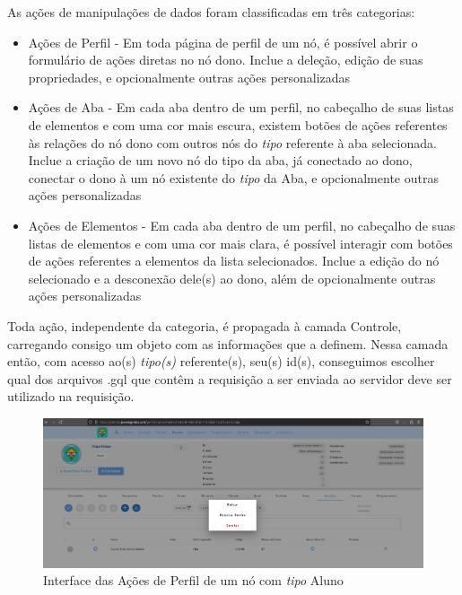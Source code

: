 As ações de manipulações de dados foram classificadas em três categorias:
\begin{itemize}
    \item Ações de Perfil - Em toda página de perfil de um nó, é possível abrir o formulário de ações diretas no nó dono. Inclue a deleção, edição de suas propriedades, e opcionalmente outras ações personalizadas
    \item Ações de Aba - Em cada aba dentro de um perfil, no cabeçalho de suas listas de elementos e com uma cor mais escura, existem botões de ações referentes às relações do nó dono com outros nós do \textit{tipo} referente à aba selecionada. Inclue a criação de um novo nó do tipo da aba, já conectado ao dono, conectar o dono à um nó existente do \textit{tipo} da Aba, e opcionalmente outras ações personalizadas
    \item Ações de Elementos - Em cada aba dentro de um perfil, no cabeçalho de suas listas de elementos e com uma cor mais clara, é possível interagir com botões de ações referentes a elementos da lista selecionados. Inclue a edição do nó selecionado e a desconexão dele(s) ao dono, além de opcionalmente outras ações personalizadas
\end{itemize}
Toda ação, independente da categoria, é propagada à camada Controle, carregando consigo um objeto com as informações que a definem. Nessa camada então, com acesso ao(s) \textit{tipo(s)} referente(s), seu(s) id(s), conseguimos escolher qual dos arquivos .gql que contêm a requisição a ser enviada ao servidor deve ser utilizado na requisição.
\begin{figure}
    \centering
    \includegraphics[width=1\linewidth]{Imagens/chap04/front-profile-actions.png}
    \caption{Interface das Ações de Perfil de um nó com \textit{tipo} Aluno}
    \label{fig:enter-label}
\end{figure}

